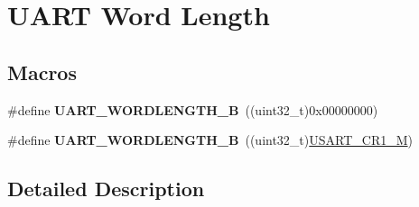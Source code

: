 \hypertarget{group___u_a_r_t___word___length}{\section{U\-A\-R\-T Word Length}
\label{group___u_a_r_t___word___length}
}
\subsection*{Macros}
\begin{DoxyCompactItemize}
\item 
\hypertarget{group___u_a_r_t___word___length_gaf394e9abaf17932ee89591f990fe6407}{\#define {\bfseries U\-A\-R\-T\-\_\-\-W\-O\-R\-D\-L\-E\-N\-G\-T\-H\-\_\-B}~((uint32\-\_\-t)0x00000000)}\label{group___u_a_r_t___word___length_gaf394e9abaf17932ee89591f990fe6407}

\item 
\hypertarget{group___u_a_r_t___word___length_gaf867be43de35fd3c32fe0b4dd4058f7e}{\#define {\bfseries U\-A\-R\-T\-\_\-\-W\-O\-R\-D\-L\-E\-N\-G\-T\-H\-\_\-B}~((uint32\-\_\-t)\hyperlink{group___peripheral___registers___bits___definition_ga95f0288b9c6aaeca7cb6550a2e6833e2}{U\-S\-A\-R\-T\-\_\-\-C\-R1\-\_\-\-M})}\label{group___u_a_r_t___word___length_gaf867be43de35fd3c32fe0b4dd4058f7e}

\end{DoxyCompactItemize}


\subsection{Detailed Description}
